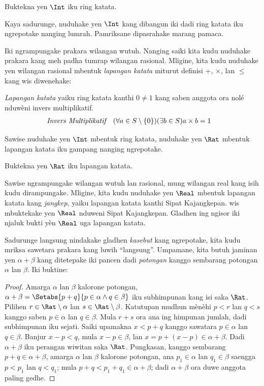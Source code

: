 \documentclass[../../../include/open-logic-section]{subfiles}
\begin{document}
\begin{prob}
Buktekna yen $\Int$ iku ring katata.
\end{prob}

Kaya sadurunge, nuduhake yen $\Int$ kang dibangun iki dadi ring katata
iku ngrepotake nanging lumrah. Pamriksane dipasrahake marang pamaca.

Iki ngrampungake prakara wilangan wutuh. Nanging saiki kita kudu nuduhake
prakara kang meh padha tumrap wilangan rasional. Mligine, kita kudu nuduhake
yen wilangan rasional mbentuk \emph{lapangan katata} miturut definisi
$+$, $\times$, lan $\leq$ kang wis diwenehake:
\begin{defn}
\emph{Lapangan katata} yaiku ring katata kanthi $0\ne 1$ kang saben anggota ora nolé nduwèni invers multiplikatif.
\begin{align*}
	\emph{Invers Multiplikatif}& & (\forall a \in S \setminus \{0\})(\exists b \in S) a\times b& = 1
\end{align*}
\end{defn}

Sawise nuduhake yen $\Int$ mbentuk ring katata, nuduhake yen $\Rat$
mbentuk lapangan katata iku gampang nanging ngrepotake.

\begin{prob}
Buktekna yen $\Rat$ iku lapangan katata.
\end{prob}

Sawise ngrampungake wilangan wutuh lan rasional, mung wilangan real kang
isih kudu dirampungake. Mligine, kita kudu nuduhake yen $\Real$ mbentuk
lapangan katata kang \emph{jangkep}, yaiku lapangan katata kanthi Sipat
Kajangkepan.  wis mbuktekake yen $\Real$
nduweni Sipat Kajangkepan. Gladhen ing ngisor iki njaluk bukti yèn $\Real$ uga lapangan katata.

Sadurunge langsung nindakake gladhen \emph{kasebut} kang ngrepotake, kita
kudu mriksa sawetara prakara kang luwih ``langsung''. Umpamane, kita butuh
jaminan yen $\alpha + \beta$ kang ditetepake iki pancen dadi
\emph{potongan} kanggo sembarang potongan $\alpha$ lan $\beta$. Iki buktine:

\begin{proof}
Amarga $\alpha$ lan $\beta$ kalorone potongan, $\alpha + \beta = \Setabs{p
+ q}{p \in \alpha \land q \in \beta}$ iku subhimpunan kang isi saka $\Rat$.
Pilihen $r \in \Rat\setminus\alpha$ lan $s \in \Rat\setminus\beta$.
Katutupan mudhun mènèhi $p<r$ lan $q<s$ kanggo saben $p\in\alpha$
lan $q\in\beta$. Mula $r+s$ ora ana ing himpunan jumlah, dadi subhimpunan
iku sejati. Saiki upamakna $x < p + q$ kanggo sawatara $p \in
\alpha$ lan $q \in \beta$. Banjur $x - p < q$, mula $x - p \in \beta$,
lan $x = p + (x - p) \in \alpha + \beta$. Dadi $\alpha + \beta$ iku
perangan wiwitan saka $\Rat$. Pungkasan, kanggo sembarang $p + q \in \alpha
+ \beta$, amarga $\alpha$ lan $\beta$ kalorone potongan, ana $p_1 \in
\alpha$ lan $q_1 \in \beta$ saengga $p < p_1$ lan $q < q_1$; mula $p + q
< p_1 + q_1 \in \alpha + \beta$; dadi $\alpha + \beta$ ora duwe anggota paling gedhe.
\end{proof}
\end{document}
